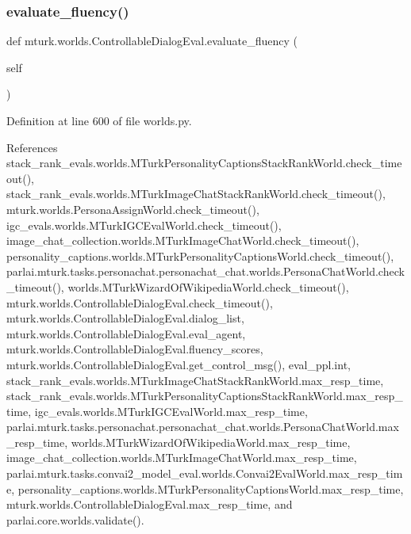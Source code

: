 \subsubsection{\texorpdfstring{evaluate\+\_\+fluency()}{evaluate\_fluency()}}
{\footnotesize\ttfamily def mturk.\+worlds.\+Controllable\+Dialog\+Eval.\+evaluate\+\_\+fluency (\begin{DoxyParamCaption}\item[{}]{self }\end{DoxyParamCaption})}



Definition at line 600 of file worlds.\+py.



References stack\+\_\+rank\+\_\+evals.\+worlds.\+M\+Turk\+Personality\+Captions\+Stack\+Rank\+World.\+check\+\_\+timeout(), stack\+\_\+rank\+\_\+evals.\+worlds.\+M\+Turk\+Image\+Chat\+Stack\+Rank\+World.\+check\+\_\+timeout(), mturk.\+worlds.\+Persona\+Assign\+World.\+check\+\_\+timeout(), igc\+\_\+evals.\+worlds.\+M\+Turk\+I\+G\+C\+Eval\+World.\+check\+\_\+timeout(), image\+\_\+chat\+\_\+collection.\+worlds.\+M\+Turk\+Image\+Chat\+World.\+check\+\_\+timeout(), personality\+\_\+captions.\+worlds.\+M\+Turk\+Personality\+Captions\+World.\+check\+\_\+timeout(), parlai.\+mturk.\+tasks.\+personachat.\+personachat\+\_\+chat.\+worlds.\+Persona\+Chat\+World.\+check\+\_\+timeout(), worlds.\+M\+Turk\+Wizard\+Of\+Wikipedia\+World.\+check\+\_\+timeout(), mturk.\+worlds.\+Controllable\+Dialog\+Eval.\+check\+\_\+timeout(), mturk.\+worlds.\+Controllable\+Dialog\+Eval.\+dialog\+\_\+list, mturk.\+worlds.\+Controllable\+Dialog\+Eval.\+eval\+\_\+agent, mturk.\+worlds.\+Controllable\+Dialog\+Eval.\+fluency\+\_\+scores, mturk.\+worlds.\+Controllable\+Dialog\+Eval.\+get\+\_\+control\+\_\+msg(), eval\+\_\+ppl.\+int, stack\+\_\+rank\+\_\+evals.\+worlds.\+M\+Turk\+Image\+Chat\+Stack\+Rank\+World.\+max\+\_\+resp\+\_\+time, stack\+\_\+rank\+\_\+evals.\+worlds.\+M\+Turk\+Personality\+Captions\+Stack\+Rank\+World.\+max\+\_\+resp\+\_\+time, igc\+\_\+evals.\+worlds.\+M\+Turk\+I\+G\+C\+Eval\+World.\+max\+\_\+resp\+\_\+time, parlai.\+mturk.\+tasks.\+personachat.\+personachat\+\_\+chat.\+worlds.\+Persona\+Chat\+World.\+max\+\_\+resp\+\_\+time, worlds.\+M\+Turk\+Wizard\+Of\+Wikipedia\+World.\+max\+\_\+resp\+\_\+time, image\+\_\+chat\+\_\+collection.\+worlds.\+M\+Turk\+Image\+Chat\+World.\+max\+\_\+resp\+\_\+time, parlai.\+mturk.\+tasks.\+convai2\+\_\+model\+\_\+eval.\+worlds.\+Convai2\+Eval\+World.\+max\+\_\+resp\+\_\+time, personality\+\_\+captions.\+worlds.\+M\+Turk\+Personality\+Captions\+World.\+max\+\_\+resp\+\_\+time, mturk.\+worlds.\+Controllable\+Dialog\+Eval.\+max\+\_\+resp\+\_\+time, and parlai.\+core.\+worlds.\+validate().



